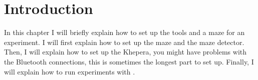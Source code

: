 \section{Introduction}
\label{sec:howto:intro}

In this chapter I will briefly explain how to set up the tools and a 
maze for an experiment. I will first explain how to set up the maze 
and the maze detector. Then, I will explain how to set up the Khepera, 
you might have problems with the Bluetooth connections, this is 
sometimes the longest part to set up. Finally, I will explain how to 
run experiments with \clsquare{}.
